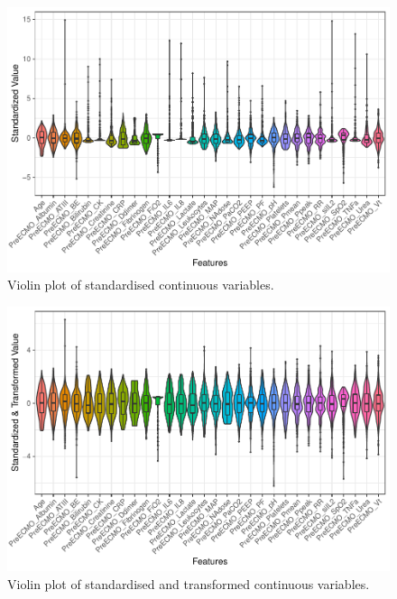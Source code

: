 \documentclass[12pt,]{article}
\begin{document}
\begin{figure}[H]

{\centering \includegraphics[width=0.75\linewidth]{figure/graphics-unnamed-chunk-9-1} 

}

\caption{\label{fig:violin-standardized}Violin plot of standardised continuous variables.}\label{fig:unnamed-chunk-9}
\end{figure}

\begin{figure}[H]

{\centering \includegraphics[width=0.75\linewidth]{figure/graphics-unnamed-chunk-10-1} 

}

\caption{\label{fig:violin-transformed}Violin plot of standardised and transformed continuous variables.}\label{fig:unnamed-chunk-10}
\end{figure}
\end{document}
